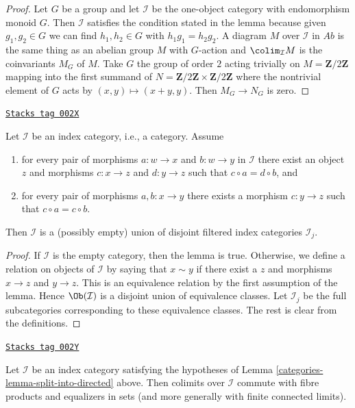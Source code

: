 \begin{proof}
\medskip\noindent
Let $G$ be a group and let $\mathcal{I}$ be the one-object category with
endomorphism monoid $G$. Then $\mathcal{I}$ satisfies the condition stated
in the lemma because given $g_1, g_2 \in G$ we can find $h_1, h_2 \in G$
with $h_1 g_1 = h_2 g_2$. A diagram $M$ over $\mathcal{I}$ in
$\textit{Ab}$ is the same thing as an abelian group $M$ with $G$-action
and $\colim_\mathcal{I} M$ is the coinvariants $M_G$ of $M$.
Take $G$ the group of order $2$ acting trivially on $M = \mathbf{Z}/2\mathbf{Z}$
mapping into the first summand of
$N = \mathbf{Z}/2\mathbf{Z} \times \mathbf{Z}/2\mathbf{Z}$
where the nontrivial element of $G$ acts by
$(x, y) \mapsto (x + y, y)$. Then $M_G \to N_G$ is zero.
\end{proof}

\begin{lemma}
\label{categories-lemma-split-into-directed}
\href{https://stacks.math.columbia.edu/tag/002X}{\texttt{Stacks tag 002X}}

Let $\mathcal{I}$ be an index category, i.e., a category.
Assume
\begin{enumerate}
\item for every pair of morphisms $a : w \to x$ and $b : w \to y$
in $\mathcal{I}$ there exist an object $z$ and morphisms $c : x \to z$
and $d : y \to z$ such that $c \circ a = d \circ b$, and
\item for every pair of morphisms $a, b : x \to y$ there exists
a morphism $c : y \to z$ such that $c \circ a = c \circ b$.
\end{enumerate}
Then $\mathcal{I}$ is a (possibly empty) union
of disjoint filtered index categories $\mathcal{I}_j$.
\end{lemma}

\begin{proof}
If $\mathcal{I}$ is the empty category, then the lemma is true.
Otherwise, we define a relation on objects of $\mathcal{I}$ by
saying that $x \sim y$ if there exist a $z$ and
morphisms $x \to z$ and $y \to z$. This is an equivalence
relation by the first assumption of the lemma. Hence $\Ob(\mathcal{I})$
is a disjoint union of equivalence classes. Let $\mathcal{I}_j$
be the full subcategories corresponding to these equivalence classes.
The rest is clear from the definitions.
\end{proof}

\begin{lemma}
\label{categories-lemma-almost-directed-commutes-equalizers}
\href{https://stacks.math.columbia.edu/tag/002Y}{\texttt{Stacks tag 002Y}}

Let $\mathcal{I}$ be an index category satisfying the hypotheses of
Lemma \ref{categories-lemma-split-into-directed} above. Then colimits over $\mathcal{I}$
commute with fibre products and equalizers in sets (and more generally
with finite connected limits).
\end{lemma}

